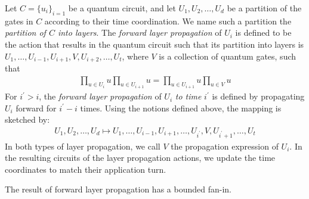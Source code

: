 \begin{definition}
  Let $C = \{ u_{i} \}_{i=1}$ be a quantum circuit, and let $U_{1}, U_{2}, \ldots, U_{d}$ be a partition of the gates in $C$ according to their time coordination. We name such a partition the \textit{partition of $C$ into layers}. The \textit{forward layer propagation} of $U_{i}$ is defined to be the action that results in the quantum circuit such that its partition into layers is $U_{1}, \ldots, U_{i-1}, U_{i+1}, V, U_{i+2}, \ldots, U_{t}$, where $V$ is a collection of quantum gates, such that
  \begin{equation*}
    \begin{split}
        \prod_{u \in U_{i}}u\prod_{u \in U_{i+1}} u= \prod_{u \in U_{i+1}} u\prod_{u\in V}u
    \end{split}
  \end{equation*}
For $i^{\prime} > i$, the \textit{forward layer propagation} of $U_{i}$ \textit{to time} $i^{\prime}$ is defined by propagating $U_{i}$ forward for $i^{\prime} - i$ times. Using the notions defined above, the mapping is sketched by:
  \begin{equation*}
    \begin{split}
      U_{1}, U_{2}, \ldots, U_{d} \mapsto U_{1}, \ldots, U_{i-1}, U_{i+1}, \ldots, U_{i^{\prime}}, V, U_{i^{\prime}+1}, \ldots, U_{t}
    \end{split}
  \end{equation*}
In both types of layer propagation, we call $V$ the propagation expression of $U_{i}$. In the resulting circuits of the layer propagation actions, we update the time coordinates to match their application turn.
\end{definition}

\begin{claim}
  The result of forward layer propagation has a bounded fan-in.
\end{claim}


